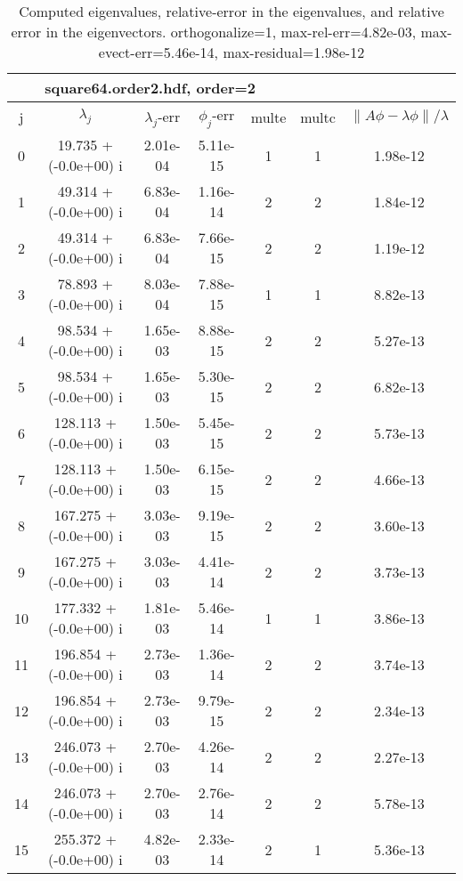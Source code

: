 \begin{table}[H]\tableFont %
\begin{center}
\begin{tabular}{|c|c|c|c|c|c|c|}  \hline
\multicolumn{5}{|c|}{square64.order2.hdf, order=2} \\ \hline
   j    &         $\lambda_j$        & $\lambda_j$-err  & $\phi_j$-err  & multe & multc & $\| A\phi - \lambda\phi\|/\lambda$     \\ \hline
     0  &     19.735 + (-0.0e+00) i  &    2.01e-04      &   5.11e-15    &   1    &  1   &    1.98e-12 \\
     1  &     49.314 + (-0.0e+00) i  &    6.83e-04      &   1.16e-14    &   2    &  2   &    1.84e-12 \\
     2  &     49.314 + (-0.0e+00) i  &    6.83e-04      &   7.66e-15    &   2    &  2   &    1.19e-12 \\
     3  &     78.893 + (-0.0e+00) i  &    8.03e-04      &   7.88e-15    &   1    &  1   &    8.82e-13 \\
     4  &     98.534 + (-0.0e+00) i  &    1.65e-03      &   8.88e-15    &   2    &  2   &    5.27e-13 \\
     5  &     98.534 + (-0.0e+00) i  &    1.65e-03      &   5.30e-15    &   2    &  2   &    6.82e-13 \\
     6  &    128.113 + (-0.0e+00) i  &    1.50e-03      &   5.45e-15    &   2    &  2   &    5.73e-13 \\
     7  &    128.113 + (-0.0e+00) i  &    1.50e-03      &   6.15e-15    &   2    &  2   &    4.66e-13 \\
     8  &    167.275 + (-0.0e+00) i  &    3.03e-03      &   9.19e-15    &   2    &  2   &    3.60e-13 \\
     9  &    167.275 + (-0.0e+00) i  &    3.03e-03      &   4.41e-14    &   2    &  2   &    3.73e-13 \\
    10  &    177.332 + (-0.0e+00) i  &    1.81e-03      &   5.46e-14    &   1    &  1   &    3.86e-13 \\
    11  &    196.854 + (-0.0e+00) i  &    2.73e-03      &   1.36e-14    &   2    &  2   &    3.74e-13 \\
    12  &    196.854 + (-0.0e+00) i  &    2.73e-03      &   9.79e-15    &   2    &  2   &    2.34e-13 \\
    13  &    246.073 + (-0.0e+00) i  &    2.70e-03      &   4.26e-14    &   2    &  2   &    2.27e-13 \\
    14  &    246.073 + (-0.0e+00) i  &    2.70e-03      &   2.76e-14    &   2    &  2   &    5.78e-13 \\
    15  &    255.372 + (-0.0e+00) i  &    4.82e-03      &   2.33e-14    &   2    &  1   &    5.36e-13 \\
\hline
\end{tabular}
\caption{Computed eigenvalues, relative-error in the eigenvalues, and relative error in the eigenvectors. orthogonalize=1, max-rel-err=4.82e-03, max-evect-err=5.46e-14, max-residual=1.98e-12
}\label{table:genEigssquare64.order2.hdf}
\end{center}
\end{table}
